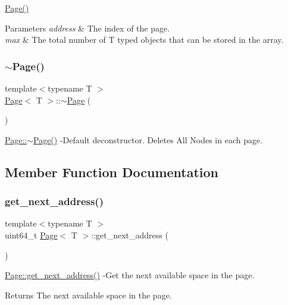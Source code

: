 \hyperlink{class_page_ac9e22e2694dfa6a7dc4f80166c0217c5}{Page()} 
\begin{DoxyParams}{Parameters}
{\em address} & The index of the page. \\
\hline
{\em max} & The total number of T typed objects that can be stored in the array. \\
\hline
\end{DoxyParams}
\mbox{\label{class_page_a7312a131c7f52718cf4f2b6f487d31bf}} 
\subsubsection{\texorpdfstring{$\sim$\+Page()}{~Page()}}
{\footnotesize\ttfamily template$<$typename T $>$ \\
\hyperlink{class_page}{Page}$<$ T $>$\+::$\sim$\hyperlink{class_page}{Page} (\begin{DoxyParamCaption}{ }\end{DoxyParamCaption})}

\hyperlink{class_page_a7312a131c7f52718cf4f2b6f487d31bf}{Page\+::$\sim$\+Page()} -\/\+Default deconstructor. Deletes All Nodes in each page. 

\subsection{Member Function Documentation}
\mbox{\label{class_page_ae6ac153d53ddb0493a4fff270dfa42cb}} 
\subsubsection{\texorpdfstring{get\+\_\+next\+\_\+address()}{get\_next\_address()}}
{\footnotesize\ttfamily template$<$typename T $>$ \\
uint64\+\_\+t \hyperlink{class_page}{Page}$<$ T $>$\+::get\+\_\+next\+\_\+address (\begin{DoxyParamCaption}{ }\end{DoxyParamCaption})}

\hyperlink{class_page_ae6ac153d53ddb0493a4fff270dfa42cb}{Page\+::get\+\_\+next\+\_\+address()} -\/\+Get the next available space in the page. \begin{DoxyReturn}{Returns}
The next available space in the page. 
\end{DoxyReturn}
\mbox{\label{class_page_a438a928e0ce67dc404f183678eb533ec}} 
